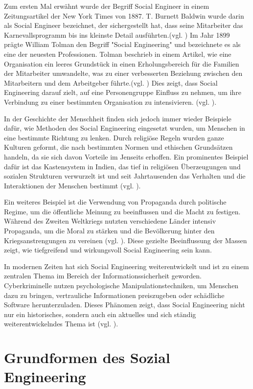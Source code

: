 Zum ersten Mal erwähnt wurde der Begriff Social Engineer in einem Zeitungsartikel der New York Times von 1887. T. Burnett Baldwin wurde darin als Social Engineer bezeichnet, der sichergestellt hat, dass seine Mitarbeiter das Karnevallsprogramm bis ins kleinste Detail ausführten.(vgl. \cite{nytimes1}) Im Jahr 1899 prägte William Tolman den Begriff "Social Engineering" und bezeichnete es als eine der neuesten Professionen. Tolman beschrieb in einem Artikel, wie eine Organisation ein leeres Grundstück in einen Erholungsbereich für die Familien der Mitarbeiter umwandelte, was zu einer verbesserten Beziehung zwischen den Mitarbeitern und dem Arbeitgeber führte.(vgl. \cite{nytimes2}) Dies zeigt, dass Social Engineering darauf zielt, auf eine Personengruppe Einfluss zu nehmen, um ihre Verbindung zu einer bestimmten Organisation zu intensivieren. (vgl. \cite{hist1}).

In der Geschichte der Menschheit finden sich jedoch immer wieder Beispiele dafür, wie Methoden des Social Engineering eingesetzt wurden, um Menschen in eine bestimmte Richtung zu lenken. Durch religiöse Regeln wurden ganze Kulturen geformt, die nach bestimmten Normen und ethischen Grundsätzen handeln, da sie sich davon Vorteile im Jenseits erhoffen. Ein prominentes Beispiel dafür ist das Kastensystem in Indien, das tief in religiösen Überzeugungen und sozialen Strukturen verwurzelt ist und seit Jahrtausenden das Verhalten und die Interaktionen der Menschen bestimmt (vgl. \cite{hindu}).

Ein weiteres Beispiel ist die Verwendung von Propaganda durch politische Regime, um die öffentliche Meinung zu beeinflussen und die Macht zu festigen. Während des Zweiten Weltkriegs nutzten verschiedene Länder intensiv Propaganda, um die Moral zu stärken und die Bevölkerung hinter den Kriegsanstrengungen zu vereinen (vgl. \cite{hisofpropaganda}). Diese gezielte Beeinflussung der Massen zeigt, wie tiefgreifend und wirkungsvoll Social Engineering sein kann.

In modernen Zeiten hat sich Social Engineering weiterentwickelt und ist zu einem zentralen Thema im Bereich der Informationssicherheit geworden. Cyberkriminelle nutzen psychologische Manipulationstechniken, um Menschen dazu zu bringen, vertrauliche Informationen preiszugeben oder schädliche Software herunterzuladen. Dieses Phänomen zeigt, dass Social Engineering nicht nur ein historisches, sondern auch ein aktuelles und sich ständig weiterentwickelndes Thema ist (vgl. \cite{mitn1}).


\section{Grundformen des Sozial Engineering}

